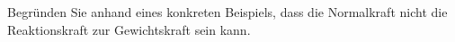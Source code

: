 Begründen Sie anhand eines konkreten Beispiels, dass die Normalkraft nicht die Reaktionskraft zur Gewichtskraft sein kann.
